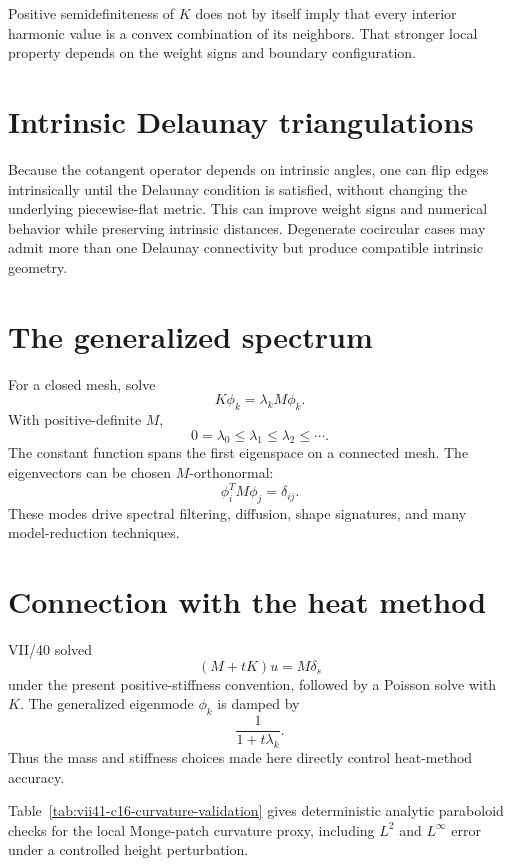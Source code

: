 \begin{warning}\label{warn:vii41-max}
Positive semidefiniteness of \(K\) does not by itself imply that every interior
harmonic value is a convex combination of its neighbors.  That stronger local
property depends on the weight signs and boundary configuration.
\end{warning}

\section{Intrinsic Delaunay triangulations}

Because the cotangent operator depends on intrinsic angles, one can flip edges
intrinsically until the Delaunay condition is satisfied, without changing the
underlying piecewise-flat metric.  This can improve weight signs and numerical
behavior while preserving intrinsic distances.  Degenerate cocircular cases
may admit more than one Delaunay connectivity but produce compatible intrinsic
geometry.

\section{The generalized spectrum}

For a closed mesh, solve
\[
K\phi_k=\lambda_k M\phi_k.
\]
With positive-definite \(M\),
\[
0=\lambda_0\le\lambda_1\le\lambda_2\le\cdots.
\]
The constant function spans the first eigenspace on a connected mesh.
The eigenvectors can be chosen \(M\)-orthonormal:
\[
\phi_i^T M\phi_j=\delta_{ij}.
\]
These modes drive spectral filtering, diffusion, shape signatures, and many
model-reduction techniques.

\section{Connection with the heat method}

VII/40 solved
\[
(M+tK)u=M\delta_s
\]
under the present positive-stiffness convention, followed by a Poisson solve
with \(K\).  The generalized eigenmode \(\phi_k\) is damped by
\[
\frac{1}{1+t\lambda_k}.
\]
Thus the mass and stiffness choices made here directly control heat-method
accuracy.

Table~\ref{tab:vii41-c16-curvature-validation} gives deterministic analytic
paraboloid checks for the local Monge-patch curvature proxy, including $L^2$ and
$L^\infty$ error under a controlled height perturbation.


